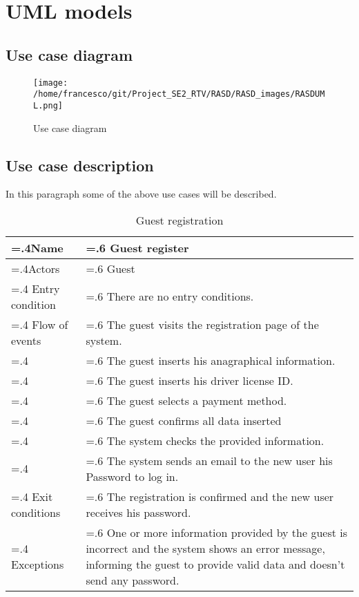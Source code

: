 \documentclass[10pt, a4paper,titlepage]{article}
\begin{document}
\section{UML models}
\subsection{Use case diagram}
\begin{figure}[!h]
\texttt{[image: /home/francesco/git/Project\_SE2\_RTV/RASD/RASD\_images/RASDUML.png]}
\caption{Use case diagram}
\label{fig:use case}
\end{figure}
\newpage
\subsection{Use case description}
In this paragraph some of the above use cases will be described.
\begin{table}[h]
\caption{Guest registration} \label{tab:scenario1}
\begin{tabularx}{\textwidth}{|>{\hsize=.4\hsize}X|>{\hsize=.6\hsize}X|}
\hline
Name & Guest register \\
\hline
Actors & Guest \\
\hline
Entry condition & There are no entry conditions. \\
\hline
Flow of events & The guest visits the registration page of the system. \\
& The guest inserts his anagraphical information.\\
& The guest inserts his driver license ID.\\
& The guest selects a payment method.\\
& The guest confirms all data inserted\\
& The system checks the provided information.\\
& The system sends an email to the new user his Password to log in.\\
\hline
Exit conditions & The registration is confirmed and the new user receives his password. \\
\hline
Exceptions & One or more information provided by the guest is incorrect and the system shows an error message, informing the guest to provide valid data and doesn't send any password.\\
\hline
\end{tabularx}
\end{table}
\end{document}
